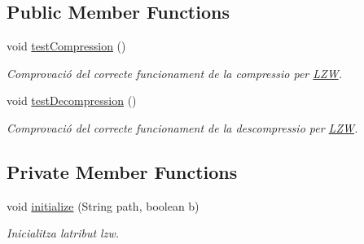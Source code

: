 \subsection*{Public Member Functions}
\begin{DoxyCompactItemize}
\item 
void \hyperlink{classdomini_1_1algorithm_1_1LZWTest_ae43f1a846dc9672b04c707314006a878}{test\+Compression} ()
\begin{DoxyCompactList}\small\item\em Comprovació del correcte funcionament de la compressio per \hyperlink{classdomini_1_1algorithm_1_1LZW}{L\+ZW}. \end{DoxyCompactList}\item 
void \hyperlink{classdomini_1_1algorithm_1_1LZWTest_aa9f013d2d8e008768c6c7b8fe319b534}{test\+Decompression} ()
\begin{DoxyCompactList}\small\item\em Comprovació del correcte funcionament de la descompressio per \hyperlink{classdomini_1_1algorithm_1_1LZW}{L\+ZW}. \end{DoxyCompactList}\end{DoxyCompactItemize}
\subsection*{Private Member Functions}
\begin{DoxyCompactItemize}
\item 
void \hyperlink{classdomini_1_1algorithm_1_1LZWTest_acf4cac88aafa2144dc8ce3a80453fa90}{initialize} (String path, boolean b)
\begin{DoxyCompactList}\small\item\em Inicialitza l\textquotesingle{}atribut lzw. \end{DoxyCompactList}\end{DoxyCompactItemize}
